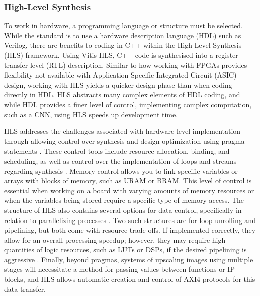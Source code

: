 \documentclass{article}
\begin{document}
        \subsubsection{High-Level Synthesis}
        \noindent To work in hardware, a programming language or structure must be selected. While the standard is to use a hardware description language (HDL) such as Verilog, there are benefits to coding in C++ within the High-Level Synthesis (HLS) framework. Using Vitis HLS, C++ code is synthesised into a register transfer level (RTL) description. Similar to how working with FPGAs provides flexibility not available with Application-Specific Integrated Circuit (ASIC) design, working with HLS yields a quicker design phase than when coding directly in HDL. HLS abstracts many complex elements of HDL coding, and while HDL provides a finer level of control, implementing complex computation, such as a CNN, using HLS speeds up development time. 
        \par HLS addresses the challenges associated with hardware-level implementation through allowing control over synthesis and design optimization using pragma statements \cite{sarg_efficient_2021}\cite{bailey_advantages_2015}. These control tools include resource allocation, binding, and scheduling, as well as control over the implementation of loops and streams regarding synthesis \cite{amd_vitis_nodate}\cite{intel_intel_2019}. Memory control allows you to link specific variables or arrays with blocks of memory, such as URAM or BRAM. This level of control is essential when working on a board with varying amounts of memory resources or when the variables being stored require a specific type of memory access. The structure of HLS also contains several options for data control, specifically in relation to parallelizing processes \cite{intel_intel_2019}. Two such structures are for loop unrolling and pipelining, but both come with resource trade-offs. If implemented correctly, they allow for an overall processing speedup; however, they may require high quantities of logic resources, such as LUTs or DSPs, if the desired pipelining is aggressive \cite{intel_intel_2019}.  Finally, beyond pragmas, systems of upscaling images using multiple stages will necessitate a method for passing values between functions or IP blocks, and HLS allows automatic creation and control of AXI4 protocols for this data transfer. 
        
\end{document}
